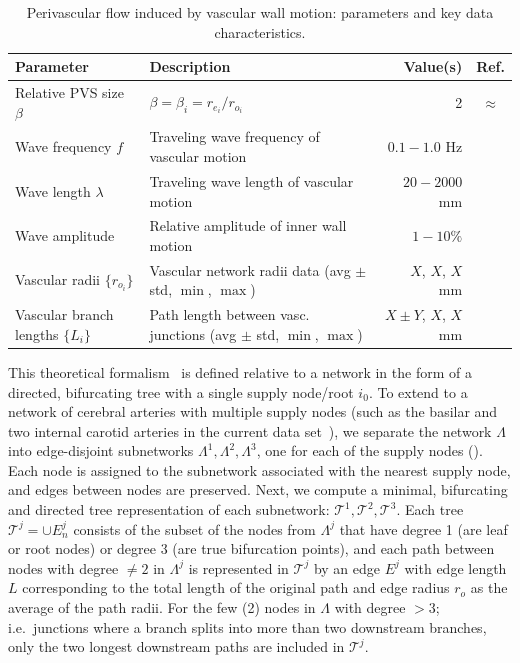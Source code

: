\begin{table}
  \small
  \begin{tabular}{llrc}
    \toprule
    Parameter & Description & Value(s)  & Ref.\\ 
    \midrule
    Relative PVS size $\beta$ & $\beta = \beta_i = r_{e_i} / r_{o_i}$ & 2 & $\approx$\cite{eide2024functional} \\
    Wave frequency $f$ & Traveling wave frequency of vascular motion & $0.1-1.0$ Hz & \discuss{\cite{gjerde2023directional}} \\
    Wave length $\lambda$ & Traveling wave length of vascular motion & $20-2000$ mm & \discuss{\cite{broggini2024long, gjerde2023directional}} \\
    Wave amplitude & Relative amplitude of inner wall motion & $1-10\%$ & \discuss{\cite{gjerde2023directional}} \\
    Vascular radii $\{r_{o_i}\}$ & Vascular network radii data (avg $\pm$ std, $\min$, $\max$) & $X$, $X$, $X$  mm & \cite{hodneland2019new} \\
    Vascular branch lengths $\{L_{i}\}$ & Path length between vasc. junctions (avg $\pm$ std, $\min$, $\max$) & $X \pm Y$, $X$, $X$  mm & \discuss{--} \\
    \bottomrule
  \end{tabular}
  \caption{Perivascular flow induced by vascular wall motion: parameters and key data characteristics.}
  \label{tab:pvs:parameters}
\end{table}


This theoretical formalism~\cite{gjerde2023directional} is defined
relative to a network in the form of a directed, bifurcating tree with
a single supply node/root $i_0$. To extend to a network of cerebral
arteries with multiple supply nodes (such as the basilar and two
internal carotid arteries in the current data
set~\cite{hodneland2019new}), we separate the network $\Lambda$ into
edge-disjoint subnetworks $\Lambda^1, \Lambda^2, \Lambda^3$, one for
each of the supply nodes (). Each node is assigned to the subnetwork associated with the nearest supply node, and edges between nodes are preserved. Next, we compute a minimal, bifurcating and directed tree representation of each subnetwork: $\mathcal{T}^1, \mathcal{T}^2, \mathcal{T}^3$. Each tree $\mathcal{T}^j = \cup E_n^j$ consists of the subset of the nodes from $\Lambda^j$ that have degree 1 (are leaf or root nodes) or degree $3$ (are true bifurcation points), and each path between nodes with degree $\not = 2$ in $\Lambda^j$ is represented in $\mathcal{T}^j$ by an edge $E^j$ with edge length $L$ corresponding to the total length of the original path and edge radius $r_o$ as the average of the path radii. For the few (2) nodes in $\Lambda$ with degree $>3$; i.e.~junctions where a branch splits into more than two downstream branches, only the two longest downstream paths are included in $\mathcal{T}^j$.

